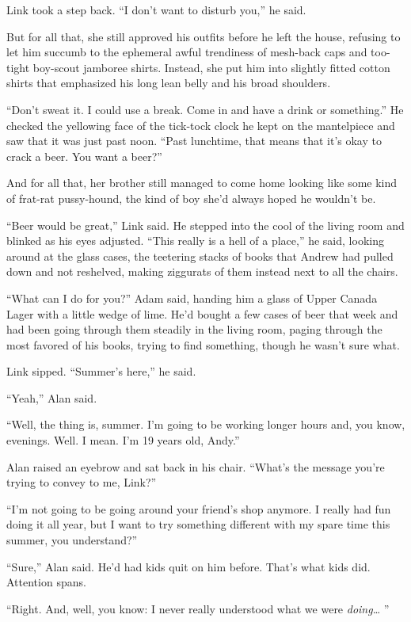 Link took a step back.  ``I don't want to disturb you,'' he said.

But for all that, she still approved his outfits before he left the
house, refusing to let him succumb to the ephemeral awful trendiness
of mesh-back caps and too-tight boy-scout jamboree shirts.  Instead,
she put him into slightly fitted cotton shirts that emphasized his
long lean belly and his broad shoulders.

``Don't sweat it.  I could use a break.  Come in and have a drink or
something.'' He checked the yellowing face of the tick-tock clock he
kept on the mantelpiece and saw that it was just past noon.  ``Past
lunchtime, that means that it's okay to crack a beer.  You want a
beer?''

And for all that, her brother still managed to come home looking like
some kind of frat-rat pussy-hound, the kind of boy she'd always hoped
he wouldn't be.

``Beer would be great,'' Link said.  He stepped into the cool of the
living room and blinked as his eyes adjusted.  ``This really is a hell
of a place,'' he said, looking around at the glass cases, the
teetering stacks of books that Andrew had pulled down and not
reshelved, making ziggurats of them instead next to all the chairs.

``What can I do for you?'' Adam said, handing him a glass of Upper
Canada Lager with a little wedge of lime.  He'd bought a few cases of
beer that week and had been going through them steadily in the living
room, paging through the most favored of his books, trying to find
something, though he wasn't sure what.

Link sipped.  ``Summer's here,'' he said.

``Yeah,'' Alan said.

``Well, the thing is, summer.  I'm going to be working longer hours
and, you know, evenings.  Well.  I mean.  I'm 19 years old, Andy.''

Alan raised an eyebrow and sat back in his chair.  ``What's the
message you're trying to convey to me, Link?''

``I'm not going to be going around your friend's shop anymore.  I
really had fun doing it all year, but I want to try something
different with my spare time this summer, you understand?''

``Sure,'' Alan said.  He'd had kids quit on him before.  That's what
kids did.  Attention spans.

``Right.  And, well, you know:  I never really understood what we were
\textit{doing}\ldots{}  ''

